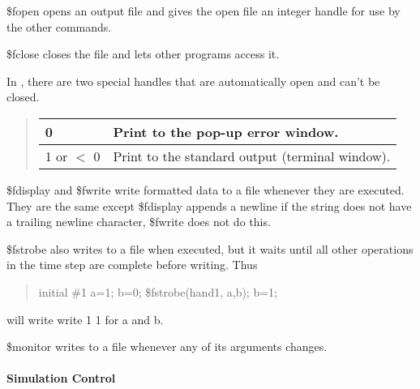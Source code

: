\begin{description}
{\vt \$fopen} opens an output file and gives the open file an integer
handle for use by the other commands.

{\vt \$fclose} closes the file and lets other programs access it.

In {\WRspice}, there are two special handles that are automatically
open and can't be closed.

\begin{quote}
\begin{tabular}{|l|l|} \hline
0 & Print to the pop-up error window.\\ \hline
1 or $<$ 0 & Print to the standard output (terminal window).\\ \hline
\end{tabular}
\end{quote}

{\vt \$fdisplay} and {\vt \$fwrite} write formatted data to a file
whenever they are executed.  They are the same except {\vt \$fdisplay}
appends a newline if the string does not have a trailing newline
character, {\vt \$fwrite} does not do this.

{\vt \$fstrobe} also writes to a file when executed, but it waits
until all other operations in the time step are complete before
writing.  Thus
\begin{quote}\vt
initial \#1 a=1; b=0; \$fstrobe(hand1, a,b); b=1;
\end{quote}
will write write 1 1 for a and b.

{\vt \$monitor} writes to a file whenever any of its arguments
changes.
\end{description}

\paragraph{Simulation Control}

